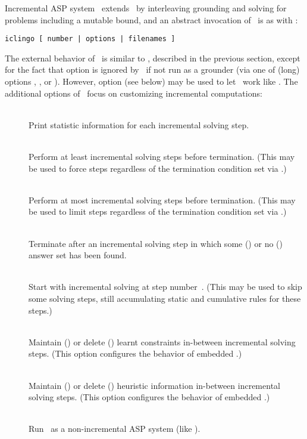 Incremental ASP system \iclingo\ extends \clingo\ by interleaving
grounding and solving for problems including a mutable bound,
and an abstract invocation of \iclingo\ is as with \clingo:
%
\begin{lstlisting}[numbers=none]
iclingo [ number | options | filenames ]
\end{lstlisting}
%
The external behavior of \iclingo\ is similar to \clingo,
described in the previous section, except for the fact that
option  is ignored by \iclingo\ if not run as a grounder
(via one of (long) options , , or ).
However, option  (see below) may be used to let \iclingo\
work like \clingo.
The additional options of \iclingo\ focus on customizing
incremental computations:
%
\begin{description}
\item[]~\\
Print statistic information for each incremental solving step.
\item[]~\\
Perform at least  incremental solving steps before termination.
(This may be used to force steps regardless of the termination condition
 set via \code{--istop}.)
\item[]~\\
Perform at most  incremental solving steps before termination.
(This may be used to limit steps regardless of the termination condition
 set via \code{--istop}.)
\item[]~\\
Terminate after an incremental solving step 
in which some () or no ()
answer set has been found.
\item[]~\\
Start with incremental solving at step number~.
(This may be used to skip some solving steps,
 still accumulating static and cumulative rules for these steps.)
\item[\code{--ilearnt keep|forget}]~\\
Maintain () or delete () learnt constraints
in-between incremental solving steps.
(This option configures the behavior of embedded \clasp.)
\item[]~\\
Maintain () or delete () heuristic information
in-between incremental solving steps.
(This option configures the behavior of embedded \clasp.)
\item[]~\\
Run \iclingo\ as a non-incremental ASP system (like \clingo).
\end{description}
